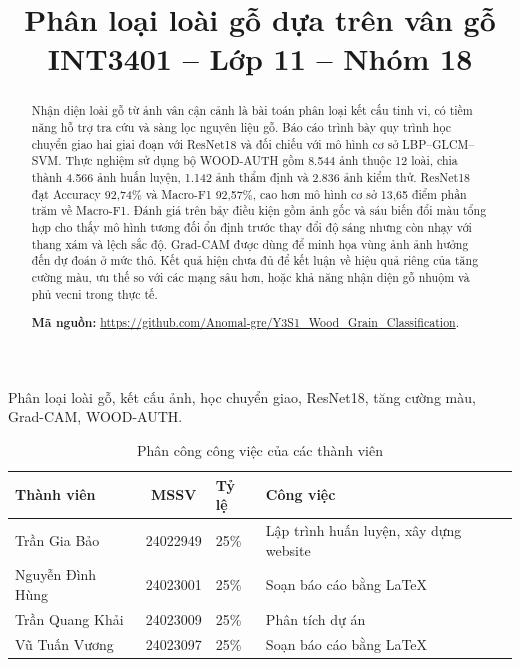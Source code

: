 \documentclass[conference]{IEEEtran}
\newcommand{\tableformat}{\footnotesize\setlength{\tabcolsep}{3pt}\renewcommand{\arraystretch}{1.15}}
\begin{document}
\title{Phân loại loài gỗ dựa trên vân gỗ\\{\large INT3401 -- Lớp 11 -- Nhóm 18}}
\author{
\and
{}
\and
{}
\and
{}
}
\maketitle

\begin{abstract}
Nhận diện loài gỗ từ ảnh vân cận cảnh là bài toán phân loại kết cấu tinh vi, có tiềm năng hỗ trợ tra cứu và sàng lọc nguyên liệu gỗ. Báo cáo trình bày quy trình học chuyển giao hai giai đoạn với ResNet18 và đối chiếu với mô hình cơ sở LBP--GLCM--SVM. Thực nghiệm sử dụng bộ WOOD-AUTH gồm 8.544 ảnh thuộc 12 loài, chia thành 4.566 ảnh huấn luyện, 1.142 ảnh thẩm định và 2.836 ảnh kiểm thử. ResNet18 đạt Accuracy 92,74\% và Macro-F1 92,57\%, cao hơn mô hình cơ sở 13,65 điểm phần trăm về Macro-F1. Đánh giá trên bảy điều kiện gồm ảnh gốc và sáu biến đổi màu tổng hợp cho thấy mô hình tương đối ổn định trước thay đổi độ sáng nhưng còn nhạy với thang xám và lệch sắc độ. Grad-CAM được dùng để minh họa vùng ảnh ảnh hưởng đến dự đoán ở mức thô. Kết quả hiện chưa đủ để kết luận về hiệu quả riêng của tăng cường màu, ưu thế so với các mạng sâu hơn, hoặc khả năng nhận diện gỗ nhuộm và phủ vecni trong thực tế.
\par\noindent\textbf{Mã nguồn:} \url{https://github.com/Anomal-gre/Y3S1_Wood_Grain_Classification}.
\end{abstract}
\begin{IEEEkeywords}
Phân loại loài gỗ, kết cấu ảnh, học chuyển giao, ResNet18, tăng cường màu, Grad-CAM, WOOD-AUTH.
\end{IEEEkeywords}

\begin{table}[!ht]
\caption{Phân công công việc của các thành viên}
\label{tab:contributions}
\centering\tableformat
\begin{tabularx}{\linewidth}{@{}lclY@{}}
\toprule
\textbf{Thành viên} & \textbf{MSSV} & \textbf{Tỷ lệ} & \textbf{Công việc} \\
\midrule
Trần Gia Bảo & 24022949 & 25\% & Lập trình huấn luyện, xây dựng website \\
Nguyễn Đình Hùng & 24023001 & 25\% & Soạn báo cáo bằng LaTeX \\
Trần Quang Khải & 24023009 & 25\% & Phân tích dự án \\
Vũ Tuấn Vương & 24023097 & 25\% & Soạn báo cáo bằng LaTeX \\
\bottomrule
\end{tabularx}
\end{table}
\end{document}

